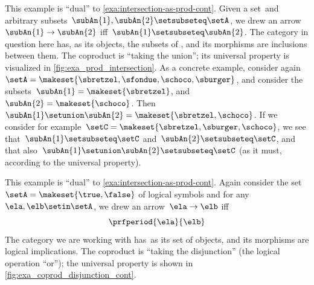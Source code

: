 \begin{example}
    \label{exa:union-as-coprod-cont}
    This example is ``dual'' to \cref{exa:intersection-as-prod-cont}.
    Given a set~\setA and arbitrary subsets~$\subAn{1}, \subAn{2} \setsubseteq \setA$, we drew an arrow~$\subAn{1} \to \subAn{2}$ iff~$\subAn{1} \setsubseteq \subAn{2}$.
    The category in question here has, as its objects, the subsets of \setA, and its morphisms are inclusions between them.
    The coproduct is ``taking the union''; its universal property is visualized in \cref{fig:exa_prod_intersection}.
    As a concrete example, consider again~$\setA = \makeset{ \sbretzel, \sfondue, \schoco, \sburger }$, and consider the subsets~$\subAn{1} = \makeset{ \sbretzel }$, and~$\subAn{2} = \makeset{\schoco}$.
    Then~$\subAn{1} \setunion \subAn{2} = \makeset{ \sbretzel, \schoco }$.
    If we consider for example~$\setC = \makeset{ \sbretzel, \sburger, \schoco }$, we see that~$\subAn{1} \setsubseteq \setC$ and~$\subAn{2} \setsubseteq \setC$, and that also~$\subAn{1} \setunion \subAn{2} \setsubseteq \setC$ (as it must, according to the universal property).
\end{example}

\begin{marginfigure}
    \centering
    \caption{Taking the disjunction.}
    \label{fig:exa_coprod_disjunction_cont}
\end{marginfigure}

\begin{marginfigure}
    \centering
    \caption{Taking the disjunction.}
    \label{fig:exa_coprod_disjunction_bool_cont}
\end{marginfigure}

\begin{example}
    \label{exa:disjunction-as-coprod-cont}
    This example is ``dual'' to \cref{exa:intersection-as-prod-cont}.
    Again consider the set~$\setA = \makeset{ \true, \false }$ of logical symbols and for any~$\ela, \elb \setin \setA$, we drew an arrow~$\ela \to \elb$ iff
    \begin{equation}
        \prfperiod{\ela}{\elb}
    \end{equation}
    The category we are working with has~\setA as its set of objects, and its morphisms are logical implications.
    The coproduct is ``taking the disjunction'' (the logical operation ``or''); the universal property is shown in \cref{fig:exa_coprod_disjunction_cont}.
\end{example}


